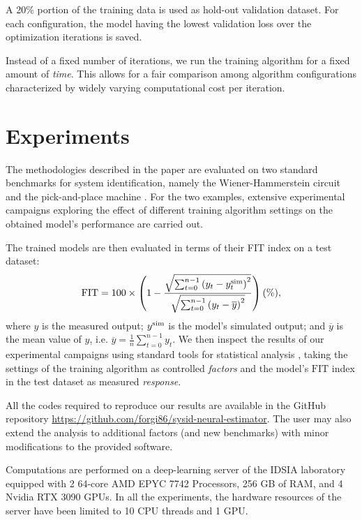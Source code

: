 \documentclass{article}
\newcommand{\nsamp}{n}
\begin{document}
A 20\% portion of the training data is used as hold-out validation dataset. For each configuration, the model having the lowest validation loss over the optimization iterations is saved. 

Instead of a fixed number of iterations, we run the training
 algorithm for a fixed amount of \emph{time}. This allows for a fair comparison among algorithm configurations characterized by widely varying computational cost per iteration.


\section{Experiments}
The methodologies described in the paper are evaluated on two standard benchmarks for system identification, namely the Wiener-Hammerstein circuit \cite{ljung2009wiener} and the pick-and-place machine \cite{juloski2004pickplace}. For the two examples, extensive experimental campaigns exploring the effect of different training algorithm settings
on the obtained model's performance are carried out. %

The trained models are then evaluated in terms of their FIT index on a test dataset:%
\begin{equation}
\label{eq:fit_index}
\mathrm{FIT} = 100 \times \left(1- \frac{\sqrt{\sum_{t=0}^{\nsamp-1} \left({y}_t -  {y}^{\rm sim}_t\right)^2} }  
{\sqrt{\sum_{t=0}^{\nsamp-1} \left({y}_t -  {\overline{{y}}}\right)^2}}\right) (\%),
\end{equation}
where ${y}$ is the measured output; ${y}^{\rm sim}$ is the model's simulated output;  
and $\overline{{y}}$ is the mean value of $y$, i.e. $\overline{{y}} = \frac{1}{\nsamp} \sum_{t=0}^{\nsamp-1} {y}_t$.
We then inspect the results of our experimental campaigns using standard tools for statistical analysis \cite{montgomery2017design}, taking the settings of the training algorithm as controlled \emph{factors} and the model's $\mathrm{FIT}$ index in the test dataset as measured \emph{response}.


All the codes required to reproduce our results are available in the GitHub repository \url{https://github.com/forgi86/sysid-neural-estimator}. The user may also 
extend the analysis to additional factors (and new benchmarks) with minor modifications to the provided software.

Computations are performed on a deep-learning server of the IDSIA laboratory equipped with 2 64-core AMD EPYC 7742 Processors, 256 GB of RAM, and 4 Nvidia RTX 3090 GPUs. In all the experiments, the hardware resources of the server have been limited to 10 CPU threads and 1 GPU.%
\end{document}

